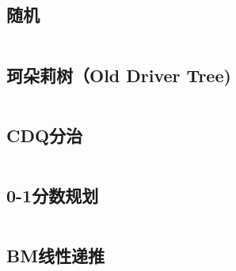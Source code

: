 \subsection{随机} 

\inputminted{cpp}{code/random.cc}

\subsection{珂朵莉树（Old Driver Tree)} 

\inputminted{cpp}{code/ODT.cc}

\subsection{CDQ分治} 

\inputminted{cpp}{code/CDQ.cc}

\subsection{0-1分数规划} 

\inputminted{cpp}{code/0-1planning.cpp}

\subsection{BM线性递推} 

\inputminted{cpp}{code/BM.cc}

\newpage